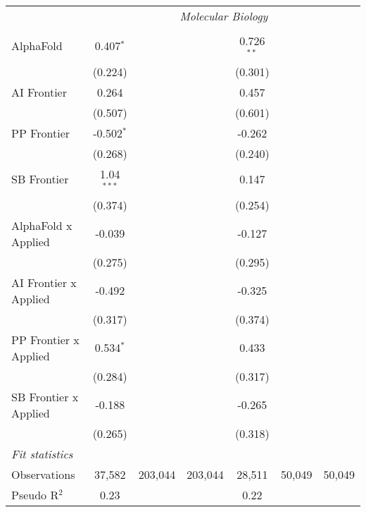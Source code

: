 \begin{tabular}{lcccccc}
 & \multicolumn{6}{c}{\textit{Molecular Biology}} \\ \\
   AlphaFold             & 0.407$^{*}$  &         &         & 0.726$^{**}$ &        &   \\   
                         & (0.224)      &         &         & (0.301)      &        &   \\   
   AI Frontier           & 0.264        &         &         & 0.457        &        &   \\   
                         & (0.507)      &         &         & (0.601)      &        &   \\   
   PP Frontier           & -0.502$^{*}$ &         &         & -0.262       &        &   \\   
                         & (0.268)      &         &         & (0.240)      &        &   \\   
   SB Frontier           & 1.04$^{***}$ &         &         & 0.147        &        &   \\   
                         & (0.374)      &         &         & (0.254)      &        &   \\   
   AlphaFold x Applied   & -0.039       &         &         & -0.127       &        &   \\   
                         & (0.275)      &         &         & (0.295)      &        &   \\   
   AI Frontier x Applied & -0.492       &         &         & -0.325       &        &   \\   
                         & (0.317)      &         &         & (0.374)      &        &   \\   
   PP Frontier x Applied & 0.534$^{*}$  &         &         & 0.433        &        &   \\   
                         & (0.284)      &         &         & (0.317)      &        &   \\   
   SB Frontier x Applied & -0.188       &         &         & -0.265       &        &   \\   
                         & (0.265)      &         &         & (0.318)      &        &   \\   
   \midrule
   \emph{Fit statistics}\\
   Observations          & 37,582       & 203,044 & 203,044 & 28,511       & 50,049 & 50,049\\  
   Pseudo R$^2$          & 0.23         &         &         & 0.22         &        & \\  
   

\end{tabular}
